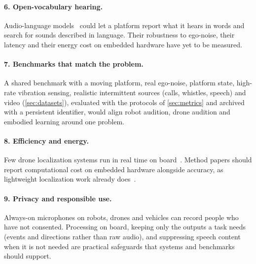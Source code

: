 \paragraph{6. Open-vocabulary hearing.}
Audio-language models~\cite{elizalde2023clap,deshmukh2023pengi,gong2024ltu,tang2024salmonn} could let a platform report what it hears in words and search for sounds described in language.
Their robustness to ego-noise, their latency and their energy cost on embedded hardware have yet to be measured.

\paragraph{7. Benchmarks that match the problem.}
A shared benchmark with a moving platform, real ego-noise, platform state, high-rate vibration sensing, realistic intermittent sources (calls, whistles, speech) and video (\cref{sec:datasets}), evaluated with the protocols of \cref{sec:metrics} and archived with a persistent identifier, would align robot audition, drone audition and embodied learning around one problem.

\paragraph{8. Efficiency and energy.}
Few drone localization systems run in real time on board~\cite{chevtchenko2025review}.
Method papers should report computational cost on embedded hardware alongside accuracy, as lightweight localization work already does~\cite{grondin2019lightweight}.

\paragraph{9. Privacy and responsible use.}
Always-on microphones on robots, drones and vehicles can record people who have not consented.
Processing on board, keeping only the outputs a task needs (events and directions rather than raw audio), and suppressing speech content when it is not needed are practical safeguards that systems and benchmarks should support.
